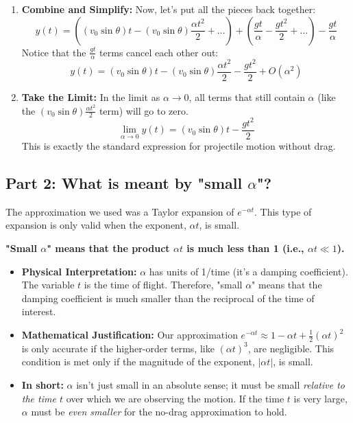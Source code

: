 \documentclass[11pt, a4paper]{article} %
\begin{document}
\begin{enumerate}
    \begin{itemize}
        \item \textbf{First term:}
        $$\frac{v_0 \sin \theta}{\alpha} \left( \alpha t - \frac{\alpha^2 t^2}{2} + \dots \right) = (v_0 \sin \theta) t - (v_0 \sin \theta) \frac{\alpha t^2}{2} + \dots$$
        \item \textbf{Second term:}
        $$\frac{g}{\alpha^2} \left( \alpha t - \frac{\alpha^2 t^2}{2} + \dots \right) = \frac{g t}{\alpha} - \frac{g t^2}{2} + \dots$$
    \end{itemize}

    \item \textbf{Combine and Simplify:} Now, let's put all the pieces back together:
    $$y(t) = \left( (v_0 \sin \theta) t - (v_0 \sin \theta) \frac{\alpha t^2}{2} + \dots \right) + \left( \frac{g t}{\alpha} - \frac{g t^2}{2} + \dots \right) - \frac{g t}{\alpha}$$
    Notice that the $\frac{g t}{\alpha}$ terms cancel each other out:
    $$y(t) = (v_0 \sin \theta) t - (v_0 \sin \theta) \frac{\alpha t^2}{2} - \frac{g t^2}{2} + O(\alpha^2)$$

    \item \textbf{Take the Limit:} In the limit as $\alpha \to 0$, all terms that still contain $\alpha$ (like the $(v_0 \sin \theta) \frac{\alpha t^2}{2}$ term) will go to zero.
    $$\lim_{\alpha \to 0} y(t) = (v_0 \sin \theta) t - \frac{g t^2}{2}$$
    This is exactly the standard expression for projectile motion without drag.
\end{enumerate}

\hrulefill

\subsection*{Part 2: What is meant by "small $\alpha$"?}

The approximation we used was a Taylor expansion of $e^{-\alpha t}$. This type of expansion is only valid when the exponent, $\alpha t$, is small.

\textbf{"Small $\alpha$" means that the product $\alpha t$ is much less than 1 (i.e., $\alpha t \ll 1$).}

\begin{itemize}
    \item \textbf{Physical Interpretation:} $\alpha$ has units of 1/time (it's a damping coefficient). The variable $t$ is the time of flight. Therefore, "small $\alpha$" means that the damping coefficient is much smaller than the reciprocal of the time of interest.
    \item \textbf{Mathematical Justification:} Our approximation $e^{-\alpha t} \approx 1 - \alpha t + \frac{1}{2}(\alpha t)^2$ is only accurate if the higher-order terms, like $(\alpha t)^3$, are negligible. This condition is met only if the magnitude of the exponent, $|\alpha t|$, is small.
    \item \textbf{In short:} $\alpha$ isn't just small in an absolute sense; it must be small \textit{relative to the time $t$} over which we are observing the motion. If the time $t$ is very large, $\alpha$ must be \textit{even smaller} for the no-drag approximation to hold.
\end{itemize}
\end{document}
